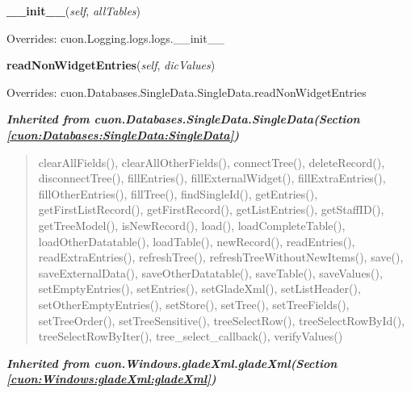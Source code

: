     \vspace{0.5ex}

\hspace{.8\funcindent}\begin{boxedminipage}{\funcwidth}

    \raggedright \textbf{\_\_init\_\_}(\textit{self}, \textit{allTables})

\setlength{\parskip}{2ex}
\setlength{\parskip}{1ex}
      Overrides: cuon.Logging.logs.logs.\_\_init\_\_

    \end{boxedminipage}

    \vspace{0.5ex}

\hspace{.8\funcindent}\begin{boxedminipage}{\funcwidth}

    \raggedright \textbf{readNonWidgetEntries}(\textit{self}, \textit{dicValues})

\setlength{\parskip}{2ex}
\setlength{\parskip}{1ex}
      Overrides: cuon.Databases.SingleData.SingleData.readNonWidgetEntries

    \end{boxedminipage}


\large{\textbf{\textit{Inherited from cuon.Databases.SingleData.SingleData\textit{(Section \ref{cuon:Databases:SingleData:SingleData})}}}}

\begin{quote}
clearAllFields(), clearAllOtherFields(), connectTree(), deleteRecord(), disconnectTree(), fillEntries(), fillExternalWidget(), fillExtraEntries(), fillOtherEntries(), fillTree(), findSingleId(), getEntries(), getFirstListRecord(), getFirstRecord(), getListEntries(), getStaffID(), getTreeModel(), isNewRecord(), load(), loadCompleteTable(), loadOtherDatatable(), loadTable(), newRecord(), readEntries(), readExtraEntries(), refreshTree(), refreshTreeWithoutNewItems(), save(), saveExternalData(), saveOtherDatatable(), saveTable(), saveValues(), setEmptyEntries(), setEntries(), setGladeXml(), setListHeader(), setOtherEmptyEntries(), setStore(), setTree(), setTreeFields(), setTreeOrder(), setTreeSensitive(), treeSelectRow(), treeSelectRowById(), treeSelectRowByIter(), tree\_select\_callback(), verifyValues()
\end{quote}

\large{\textbf{\textit{Inherited from cuon.Windows.gladeXml.gladeXml\textit{(Section \ref{cuon:Windows:gladeXml:gladeXml})}}}}


